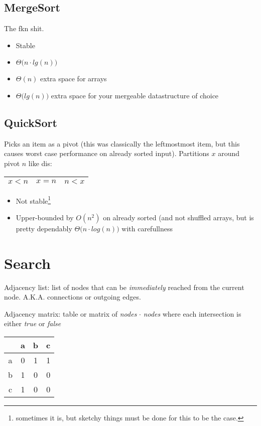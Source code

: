 \documentclass[12pt, letterpaper]{article}
\begin{document}
\subsection{MergeSort}
The fkn shit.
\begin{itemize}
\item Stable
\item $\Theta\big(n\cdot lg(n)\big)$
\item $\Theta (n)$ extra space for arrays
\item$\Theta\big(lg(n)\big)$ extra space for your mergeable datastructure of choice
\end{itemize}
\subsection{QuickSort}
Picks an item as a pivot (this was classically the leftmostmost item, but this causes worst case performance on already sorted input). Partitions $x$ around pivot $n$ like dis: 
\begin{tabular}{| c | c | c |}
\hline
$x < n$ & $x = n$ & $n<x$ \\
\hline
\end{tabular}
\begin{itemize}
\item Not stable\footnote{sometimes it is, but sketchy things must be done for this to be the case.}
\item Upper-bounded by $O(n^2)$ on already sorted (and not shuffled arrays, but is pretty dependably $\Theta\big(n\cdot log(n)\big)$ with carefullness
\end{itemize}
\section{Search}
Adjacency list: list of nodes that can be \emph{immediately} reached from the current node. A.K.A. connections or outgoing edges.

Adjacency matrix: table or matrix of \emph{nodes} $\cdot$ \emph{nodes} where each intersection is either \emph{true} or \emph{false}

\begin{center}
\begin{tabular}{c | c c c}
 & a & b & c \\ \hline
 a & 0 & 1 & 1 \\
 b & 1 & 0 & 0 \\
 c & 1 & 0 & 0 \\
\end{tabular}
\end{center}
\end{document}
